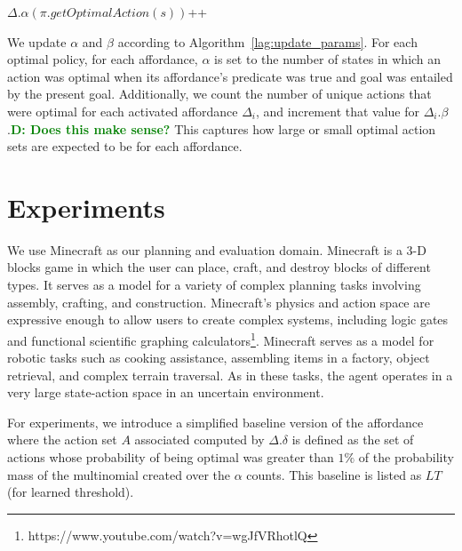 \documentclass[conference]{IEEEtran}
\newcommand{\dnote}[1]{\textcolor{Green}{\textbf{D: #1}}}
\begin{document}
\begin{algorithm}
  \caption{$updateParameters(knowledgeBase, \pi)$}
  \begin{algorithmic}[1]
    \State $\Delta.\alpha(\pi.getOptimalAction(s))$++
    \EndIf
    \EndFor
    \EndFor
  \end{algorithmic}
  \label{alg:update_params}
  \caption{\dnote{I need to add beta counts to this algorithm. It's a bit tricky to do concisely so I'm taking some time on it}}
\end{algorithm}

We update $\alpha$ and $\beta$ according to Algorithm~\ref{lag:update_params}.
For each optimal policy, for each affordance, $\alpha$ is set to the number of states
in which an action was optimal when its affordance's predicate was true and goal was
entailed by the present goal. Additionally, we count the number of unique actions that
were optimal for each activated affordance $\Delta_i$, and increment that value for
$\Delta_i.\beta$.\dnote{Does this make sense?} This captures how large or small optimal
action sets are expected to be for each affordance.

\section{Experiments}
\label{sec:experiments}

We use Minecraft as our planning and evaluation domain. Minecraft is a
3-D blocks game in which the user can place, craft, and destroy blocks
of different types. It serves as a model for a variety of complex planning tasks involving 
assembly, crafting, and construction.  Minecraft's physics and action space are expressive
enough to allow users to create complex systems, including logic gates and 
functional scientific graphing calculators\footnote{https://www.youtube.com/watch?v=wgJfVRhotlQ}.
Minecraft serves as a model for robotic tasks such as cooking assistance, assembling
items in a factory, object retrieval, and complex terrain traversal.  As in these tasks, 
the agent operates in a very large state-action space in an uncertain environment.

For experiments, we introduce a simplified baseline version of the affordance where
the action set $A$ associated computed by $\Delta.\delta$ is defined
as the set of actions whose probability of being optimal was greater than $1\%$
of the probability mass of the multinomial created over the $\alpha$ counts. This
baseline is listed as $LT$ (for learned threshold).
\end{document}
